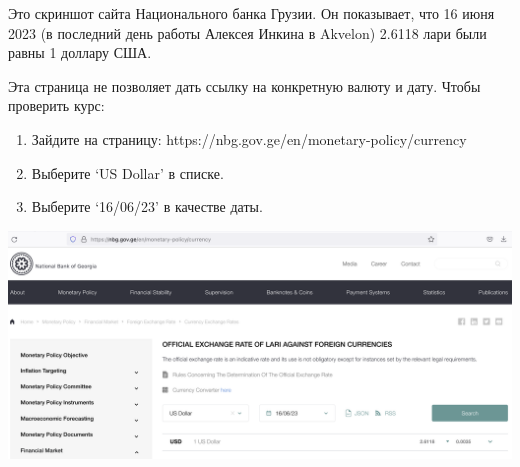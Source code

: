 
Это скриншот сайта Национального банка Грузии.
Он показывает, что 16 июня 2023 (в последний день работы Алексея Инкина в Akvelon)
2.6118 лари были равны 1 доллару США.

Эта страница не позволяет дать ссылку на конкретную валюту и дату.
Чтобы проверить курс:

\begin{enumerate}
    \item Зайдите на страницу: https://nbg.gov.ge/en/monetary-policy/currency
    \item Выберите `US Dollar' в списке.
    \item Выберите `16/06/23' в качестве даты.
\end{enumerate}

\includegraphics[width=\textwidth]{currency-rate}

\pagebreak

